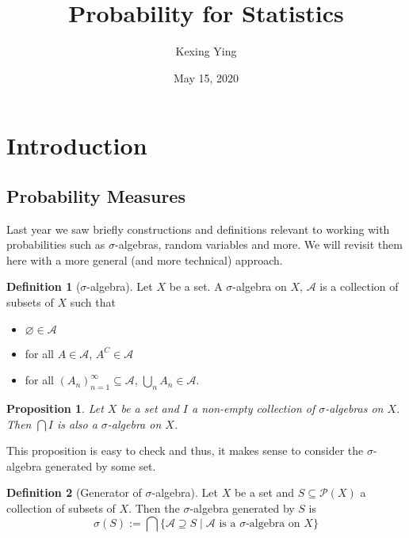 \documentclass[
]{article}
\title{Probability for Statistics}
\author{Kexing Ying}
\date{May 15, 2020}
\newtheorem{prop}{Proposition}[theorem]
\theoremstyle{definition}
\newtheorem{definition}{Definition}[section]
\begin{document}
\maketitle

{
\hypersetup{linkcolor=}
\setcounter{tocdepth}{2}
\tableofcontents
}
\hypertarget{introduction}{%
\section{Introduction}\label{introduction}}

\hypertarget{probability-measures}{%
\subsection{Probability Measures}\label{probability-measures}}

Last year we saw briefly constructions and definitions relevant to
working with probabilities such as \(\sigma\)-algebras, random variables
and more. We will revisit them here with a more general (and more
technical) approach.

\begin{definition}[\(\sigma\)-algebra]
  Let \(X\) be a set. A \(\sigma\)-algebra on \(X\), \(\mathcal{A}\) is a 
  collection of subsets of \(X\) such that 
  \begin{itemize}
    \item \(\varnothing \in \mathcal{A}\) 
    \item for all \(A \in \mathcal{A}\), \(A^C \in \mathcal{A}\)
    \item for all \((A_n)_{n = 1}^\infty \subseteq \mathcal{A}\), 
      \(\bigcup_n A_n \in \mathcal{A}\).
  \end{itemize}
\end{definition}

\begin{prop}
  Let \(X\) be a set and \(I\) a non-empty collection of \(\sigma\)-algebras on 
  \(X\). Then \(\bigcap I\) is also a \(\sigma\)-algebra on \(X\).
\end{prop}

This proposition is easy to check and thus, it makes sense to consider
the \(\sigma\)-algebra generated by some set.

\begin{definition}[Generator of \(\sigma\)-algebra]
  Let \(X\) be a set and \(S \subseteq \mathcal{P}(X)\) a collection of subsets 
  of \(X\). Then the \(\sigma\)-algebra generated by \(S\) is 
  \[
    \sigma(S) := \bigcap \{\mathcal{A} \supseteq S \mid \mathcal{A} 
      \text{ is a \(\sigma\)-algebra on \(X\)} \}
  \]
\end{definition}
\end{document}
